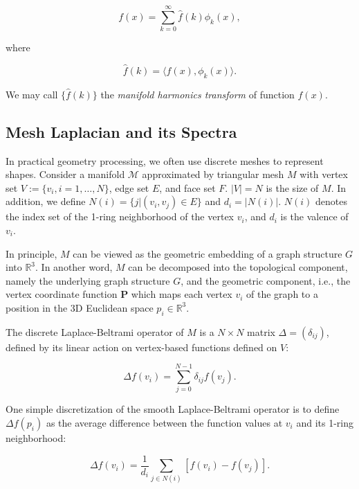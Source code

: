 \begin{equation}\label{eq:ift}
f(x)=\sum_{k=0}^\infty\hat{f}(k)\phi_k(x),
\end{equation}

where

\begin{equation}
\hat{f}(k)=\langle f(x),\phi_k(x)\rangle.
\end{equation}

We may call $\{\hat{f}(k)\}$ the \emph{manifold harmonics transform} of function $f(x)$.

\subsection*{Mesh Laplacian and its Spectra}

In practical geometry processing, we often use discrete meshes to represent shapes. 
Consider a manifold $\mathcal{M}$ approximated by triangular mesh $M$ with vertex
set $V:=\{v_i, i=1,\ldots,N\}$, edge set $E$, and face set $F$. $|V|=N$ is the size
of $M$. In addition, we define $N(i)=\{j|(v_i,v_j)\in E\}$ and $d_i=|N(i)|$. $N(i)$
denotes the index set of the 1-ring neighborhood of the vertex $v_i$, and $d_i$ is
the valence of $v_i$.

In principle, $M$ can be viewed as the geometric embedding of a graph structure 
$G$ into $\mathbb{R}^3$. In another word, $M$ can be decomposed into the 
topological component, namely the underlying graph structure $G$, and the geometric 
component, i.e., the vertex coordinate function $\mathbf{P}$ which maps each vertex 
$v_i$ of the graph to a position in the 3D Euclidean space $p_i\in\mathbb{R}^3$.

The discrete Laplace-Beltrami operator of $M$ is a $N\times N$ matrix 
$\Delta=(\delta_{ij})$, defined by its linear action
on vertex-based functions defined on $V$:

\begin{equation}
\Delta f(v_i)=\sum_{j=0}^{N-1}\delta_{ij}f(v_j).
\end{equation}

One simple discretization of the smooth Laplace-Beltrami operator is to
define $\Delta f(p_i)$ as the average difference between the function
values at $v_i$ and its 1-ring neighborhood:

\begin{equation}
\Delta f(v_i)=\frac{1}{d_i}\sum_{j\in N(i)} [f(v_i)-f(v_j)].
\end{equation}

